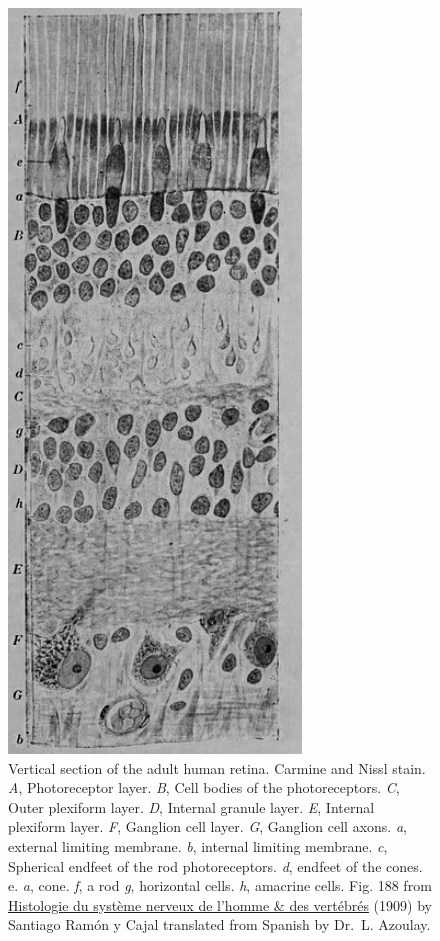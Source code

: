 \begin{figure}

{\centering \includegraphics[width=0.7\linewidth]{./figures/visual/retina_cajal} 

}

\caption{Vertical section of the adult human retina. Carmine and Nissl stain. \emph{A}, Photoreceptor layer. \emph{B}, Cell bodies of the photoreceptors. \emph{C}, Outer plexiform layer. \emph{D}, Internal granule layer. \emph{E}, Internal plexiform layer. \emph{F}, Ganglion cell layer. \emph{G}, Ganglion cell axons. \emph{a}, external limiting membrane. \emph{b}, internal limiting membrane. \emph{c}, Spherical endfeet of the rod photoreceptors. \emph{d}, endfeet of the cones. e. \emph{a}, cone. \emph{f}, a rod \emph{g}, horizontal cells. \emph{h}, amacrine cells. Fig. 188 from \href{https://wellcomelibrary.org/item/b2129592x\#?c=0\&m=0\&s=0\&cv=0\&z=-0.9137\%2C-0.0887\%2C2.8274\%2C1.7747}{Histologie du système nerveux de l'homme \& des vertébrés} (1909) by Santiago Ramón y Cajal translated from Spanish by Dr.~L. Azoulay.}\label{fig:retcajal}
\end{figure}


